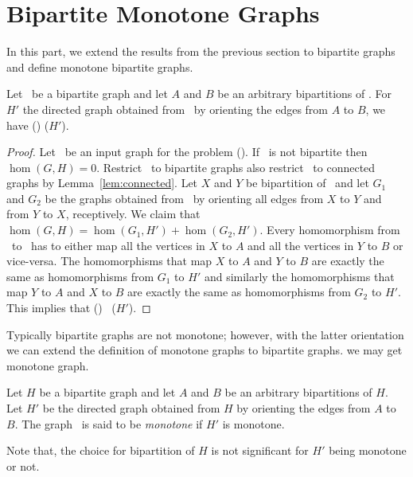 \section{Bipartite Monotone Graphs}
In this part, we extend the results from the previous section to bipartite
graphs and define monotone bipartite graphs.

\begin{theorem}  \label{thrm:bior}
Let \mH\ be a bipartite graph and let \(A\) and \(B\) be an arbitrary
bipartitions of \mH\@. For \(H'\) the directed graph obtained from
\mH\ by orienting the edges from \(A\) to \(B\), we have \chom(\mH) \maple \chom(\(H'\)).
\end{theorem}

\begin{proof}
Let \mG\ be an input graph for the problem \chom(\mH). If \mG\ is not bipartite then 
\(\hom(G,H)=0\). Restrict \mG\ to bipartite graphs also restrict \mG\ to connected graphs
by Lemma~\ref{lem:connected}\@. Let \(X\) and \(Y\) be bipartition of \mG\ and let \(G_1\) 
and \(G_2\) be the graphs obtained from \mG\ by orienting all edges from \(X\) to \(Y\) and
from \(Y\) to \(X\), receptively. We claim that \(\hom(G,H) = \hom(G_1, H') + \hom(G_2, H')\).
Every homomorphism from \mG\ to \mH\ has to either map all the vertices in
\(X\) to \(A\) and all the vertices in \(Y\) to \(B\) or vice-versa. The homomorphisms that
map \(X\) to \(A\) and \(Y\) to \(B\) are exactly the same as homomorphisms from \(G_1\) to
\(H'\) and similarly the homomorphisms that map \(Y\) to \(A\) and \(X\) to \(B\)
are exactly the same as homomorphisms from \(G_2\) to \(H'\)\@. This implies that
\chom(\mH) \maple\ \chom(\(H'\))\@.
\end{proof}

Typically bipartite graphs are not monotone; however, with the latter orientation
we can extend the definition of monotone graphs to bipartite graphs.
we may get monotone graph.

\begin{defi} 
Let \(H\) be a bipartite graph and let \(A\) and \(B\) be an arbitrary
bipartitions of \(H\). Let \(H'\) be the directed graph obtained from
\(H\) by orienting the edges from \(A\) to \(B\)\@. The graph \mH\ is said to be
\emph{monotone} if \(H'\) is monotone.
\end{defi}

Note that, the choice for bipartition of \(H\) is not significant for
\(H'\) being monotone or not.


